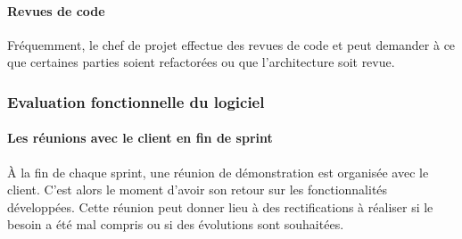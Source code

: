\paragraph{Revues de code\\}
Fréquemment, le chef de projet effectue des revues de code et peut demander à ce que certaines parties soient refactorées ou que l'architecture soit revue.

\subsubsection{Evaluation fonctionnelle du logiciel}
\paragraph*{Les réunions avec le client en fin de sprint\\}
À la fin de chaque sprint, une réunion de démonstration est organisée avec le client. C'est alors le moment d'avoir son retour sur les fonctionnalités développées. Cette réunion peut donner lieu à des rectifications à réaliser si le besoin a été mal compris ou si des évolutions sont souhaitées. \\

